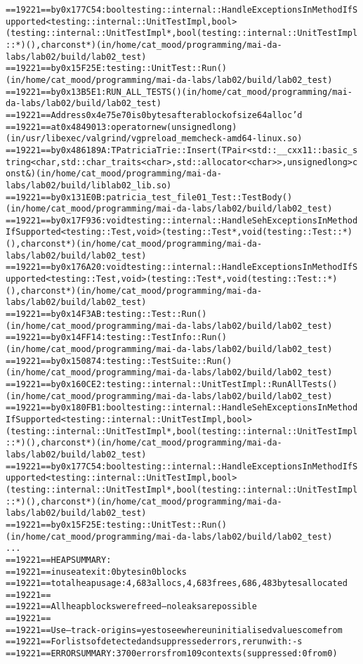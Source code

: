 \begin{alltt}
==19221==    by 0x177C54: bool testing::internal::HandleExceptionsInMethodIfSupported<testing::internal::UnitTestImpl, bool>(testing::internal::UnitTestImpl*, bool (testing::internal::UnitTestImpl::*)(), char const*) (in /home/cat_mood/programming/mai-da-labs/lab02/build/lab02_test)
==19221==    by 0x15F25E: testing::UnitTest::Run() (in /home/cat_mood/programming/mai-da-labs/lab02/build/lab02_test)
==19221==    by 0x13B5E1: RUN_ALL_TESTS() (in /home/cat_mood/programming/mai-da-labs/lab02/build/lab02_test)
==19221==  Address 0x4e75e70 is 0 bytes after a block of size 64 alloc'd
==19221==    at 0x4849013: operator new(unsigned long) (in /usr/libexec/valgrind/vgpreload_memcheck-amd64-linux.so)
==19221==    by 0x486189A: TPatriciaTrie::Insert(TPair<std::__cxx11::basic_string<char, std::char_traits<char>, std::allocator<char> >, unsigned long> const&) (in /home/cat_mood/programming/mai-da-labs/lab02/build/liblab02_lib.so)
==19221==    by 0x131E0B: patricia_test_file01_Test::TestBody() (in /home/cat_mood/programming/mai-da-labs/lab02/build/lab02_test)
==19221==    by 0x17F936: void testing::internal::HandleSehExceptionsInMethodIfSupported<testing::Test, void>(testing::Test*, void (testing::Test::*)(), char const*) (in /home/cat_mood/programming/mai-da-labs/lab02/build/lab02_test)
==19221==    by 0x176A20: void testing::internal::HandleExceptionsInMethodIfSupported<testing::Test, void>(testing::Test*, void (testing::Test::*)(), char const*) (in /home/cat_mood/programming/mai-da-labs/lab02/build/lab02_test)
==19221==    by 0x14F3AB: testing::Test::Run() (in /home/cat_mood/programming/mai-da-labs/lab02/build/lab02_test)
==19221==    by 0x14FF14: testing::TestInfo::Run() (in /home/cat_mood/programming/mai-da-labs/lab02/build/lab02_test)
==19221==    by 0x150874: testing::TestSuite::Run() (in /home/cat_mood/programming/mai-da-labs/lab02/build/lab02_test)
==19221==    by 0x160CE2: testing::internal::UnitTestImpl::RunAllTests() (in /home/cat_mood/programming/mai-da-labs/lab02/build/lab02_test)
==19221==    by 0x180FB1: bool testing::internal::HandleSehExceptionsInMethodIfSupported<testing::internal::UnitTestImpl, bool>(testing::internal::UnitTestImpl*, bool (testing::internal::UnitTestImpl::*)(), char const*) (in /home/cat_mood/programming/mai-da-labs/lab02/build/lab02_test)
==19221==    by 0x177C54: bool testing::internal::HandleExceptionsInMethodIfSupported<testing::internal::UnitTestImpl, bool>(testing::internal::UnitTestImpl*, bool (testing::internal::UnitTestImpl::*)(), char const*) (in /home/cat_mood/programming/mai-da-labs/lab02/build/lab02_test)
==19221==    by 0x15F25E: testing::UnitTest::Run() (in /home/cat_mood/programming/mai-da-labs/lab02/build/lab02_test)
...
==19221== HEAP SUMMARY:
==19221==     in use at exit: 0 bytes in 0 blocks
==19221==   total heap usage: 4,683 allocs, 4,683 frees, 686,483 bytes allocated
==19221== 
==19221== All heap blocks were freed -- no leaks are possible
==19221== 
==19221== Use --track-origins=yes to see where uninitialised values come from
==19221== For lists of detected and suppressed errors, rerun with: -s
==19221== ERROR SUMMARY: 3700 errors from 109 contexts (suppressed: 0 from 0)
\end{alltt}

